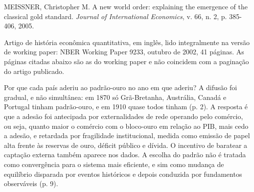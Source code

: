 
\begin{identificacao}
MEISSNER, Christopher M. A new world order: explaining the emergence of the
classical gold standard. \emph{Journal of International Economics}, v. 66,
n. 2, p. 385-406, 2005.

Artigo de história econômica quantitativa, em inglês, lido integralmente na
versão de working paper: NBER Working Paper 9233, outubro de 2002, 41 páginas.
As páginas citadas abaixo são as do working paper e não coincidem com a
paginação do artigo publicado.
\end{identificacao}

Por que cada país aderiu ao padrão-ouro no ano em que aderiu? A difusão foi
gradual, e não simultânea: em 1870 só Grã-Bretanha, Austrália, Canadá e
Portugal tinham padrão-ouro, e em 1910 quase todos tinham (p. 2). A resposta é
que a adesão foi antecipada por externalidades de rede operando pelo comércio,
ou seja, quanto maior o comércio com o bloco-ouro em relação ao PIB, mais cedo
a adesão, e retardada por fragilidade institucional, medida como emissão de
papel alta frente às reservas de ouro, déficit público e dívida. O incentivo de
baratear a captação externa também aparece nos dados. A escolha do padrão não é
tratada como convergência para o sistema mais eficiente, e sim como mudança de
equilíbrio disparada por eventos históricos e depois conduzida por fundamentos
observáveis (p. 9).

